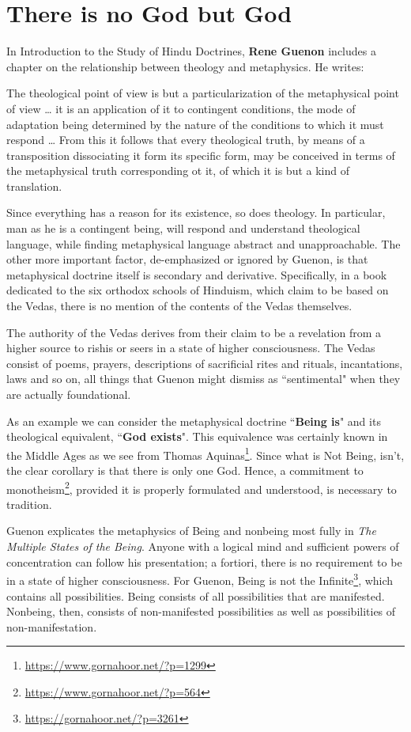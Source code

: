 \section{There is no God but God}

In Introduction to the Study of Hindu Doctrines, \textbf{Rene Guenon} includes a chapter on the relationship between theology and metaphysics. He writes:

\begin{quotex}
The theological point of view is but a particularization of the metaphysical point of view … it is an application of it to contingent conditions, the mode of adaptation being determined by the nature of the conditions to which it must respond … From this it follows that every theological truth, by means of a transposition dissociating it form its specific form, may be conceived in terms of the metaphysical truth corresponding ot it, of which it is but a kind of translation. 

\end{quotex}
Since everything has a reason for its existence, so does theology. In particular, man as he is a contingent being, will respond and understand theological language, while finding metaphysical language abstract and unapproachable. The other more important factor, de-emphasized or ignored by Guenon, is that metaphysical doctrine itself is secondary and derivative. Specifically, in a book dedicated to the six orthodox schools of Hinduism, which claim to be based on the Vedas, there is no mention of the contents of the Vedas themselves.

The authority of the Vedas derives from their claim to be a revelation from a higher source to rishis or seers in a state of higher consciousness. The Vedas consist of poems, prayers, descriptions of sacrificial rites and rituals, incantations, laws and so on, all things that Guenon might dismiss as ``sentimental" when they are actually foundational.

As an example we can consider the metaphysical doctrine ``\textbf{Being is}" and its theological equivalent, ``\textbf{God exists}". This equivalence was certainly known in the Middle Ages as we see from Thomas Aquinas\footnote{\url{https://www.gornahoor.net/?p=1299}}. Since what is Not Being, isn't, the clear corollary is that there is only one God. Hence, a commitment to monotheism\footnote{\url{https://www.gornahoor.net/?p=564}}, provided it is properly formulated and understood, is necessary to tradition.

Guenon explicates the metaphysics of Being and nonbeing most fully in \textit{The Multiple States of the Being}. Anyone with a logical mind and sufficient powers of concentration can follow his presentation; a fortiori, there is no requirement to be in a state of higher consciousness. For Guenon, Being is not the Infinite\footnote{\url{https://gornahoor.net/?p=3261}}, which contains all possibilities. Being consists of all possibilities that are manifested. Nonbeing, then, consists of non-manifested possibilities as well as possibilities of non-manifestation.

